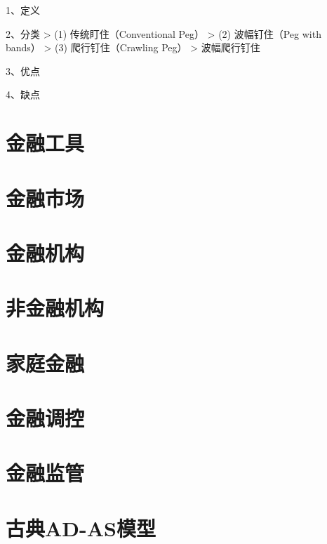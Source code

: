 \documentclass[12pt]{book}
\begin{document}
1、定义

2、分类
> (1) 传统盯住（Conventional Peg） 
> (2) 波幅钉住（Peg with bands） 
> (3) 爬行钉住（Crawling Peg） 
> 波幅爬行钉住

3、优点

4、缺点










\chapter{金融工具}




\chapter{金融市场}




\chapter{金融机构}




\chapter{非金融机构}




\chapter{家庭金融}




\chapter{金融调控}




\chapter{金融监管}









\chapter{古典AD-AS模型}\label{chapter:古典AD-AS模型}
\end{document}

